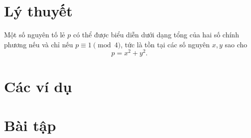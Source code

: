 \documentclass[../../imo-training-open-book.tex]{subfiles}
\begin{document}
\section{Lý thuyết}

\begin{theorem*}
    \label{theorem:fermat-sums-of-two-squares-theorem}
    Một số nguyên tố lẻ \( p \) có thể được biểu diễn dưới dạng tổng của hai số chính phương nếu và chỉ nếu \( p \equiv 1 \pmod{4} \),
    tức là tồn tại các số nguyên \( x, y \) sao cho
    \[
        p = x^2 + y^2.
    \]
\end{theorem*}

\newpage

\section{Các ví dụ}

 \newpage
 \newpage

\section{Bài tập}

\newpage
\end{document}
